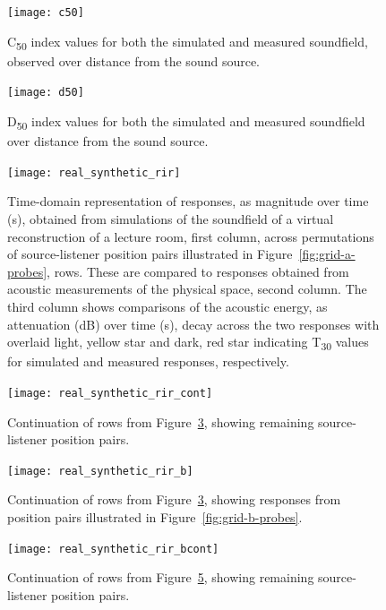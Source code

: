 \begin{figure}
    \centering
    \texttt{[image: c50]}
    \caption{C\textsubscript{50} index values for both the simulated and measured soundfield, observed over distance from the sound source.}
    \label{fig:c50comparison}
\end{figure}
\begin{figure}
    \centering
    \texttt{[image: d50]}
    \caption{D\textsubscript{50} index values for both the simulated and measured soundfield over distance from the sound source.}
    \label{fig:d50comparison}
\end{figure}

\begin{figure}
    \centering
    \texttt{[image: real\_synthetic\_rir]}
    \caption{Time-domain representation of responses, as magnitude over time (s), obtained from simulations of the soundfield of a virtual reconstruction of a lecture room, first column, across permutations of source-listener position pairs illustrated in Figure~\ref{fig:grid-a-probes}, rows. These are compared to responses obtained from acoustic measurements of the physical space, second column. The third column shows comparisons of the acoustic energy, as attenuation (dB) over time (s), decay across the two responses with overlaid light, yellow star and dark, red star indicating T\textsubscript{30} values for simulated and measured responses, respectively.}
    \label{fig:rir-comparisons-grid-a}
\end{figure}
\begin{figure}
    \centering
    \texttt{[image: real\_synthetic\_rir\_cont]}
    \caption{Continuation of rows from Figure~\ref{fig:rir-comparisons-grid-a}, showing remaining source-listener position pairs.}
    \label{fig:rir-comparisons-grid-a2}
\end{figure}
\begin{figure}
    \centering
    \texttt{[image: real\_synthetic\_rir\_b]}
    \caption{Continuation of rows from Figure~\ref{fig:rir-comparisons-grid-a}, showing responses from position pairs illustrated in Figure~\ref{fig:grid-b-probes}.}
    \label{fig:rir-comparisons-grid-b}
\end{figure}
\begin{figure}
    \centering
    \texttt{[image: real\_synthetic\_rir\_bcont]}
    \caption{Continuation of rows from Figure~\ref{fig:rir-comparisons-grid-b}, showing remaining source-listener position pairs.}
    \label{fig:rir-comparisons-grid-b2}
\end{figure}


